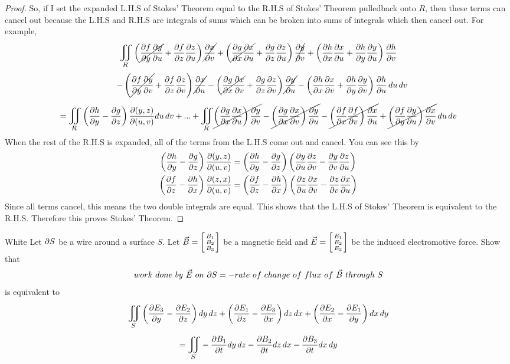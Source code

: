 \documentclass[titlepage]{article}
\begin{document}
\begin{proof}
So, if I set the expanded L.H.S of Stokes' Theorem equal to the R.H.S of Stokes' Theorem pulledback onto $R$, then these terms can cancel out because the L.H.S and R.H.S are integrals of sums which can be broken into sums of integrals which then cancel out. For example,
$$\bigiint{R}{}\left(\cancel{\frac{\p f}{\p y} \frac{\p y}{\p u}} + \frac{\p f}{\p z} \frac{\p z}{\p u}\right)\cancel{\frac{\p x}{\p v}} +  \left(\cancel{\frac{\p g}{\p x} \frac{\p x}{\p u}} + \frac{\p g}{\p z} \frac{\p z}{\p u}\right)\cancel{\frac{\p y}{\p v}}  +  \left(\frac{\p h}{\p x} \frac{\p x}{\p u} + \frac{\p h}{\p y} \frac{\p y}{\p u}\right)\frac{\p h}{\p v}$$ 
$$\quad\hspace{-.15em}-\left(\cancel{\frac{\partial f}{\partial y} \frac{\partial y}{\partial v}} + \frac{\partial f}{\partial z} \frac{\partial z}{\partial v}\right)\cancel{\frac{\partial x}{\partial u}} -  \left(\cancel{\frac{\partial g}{\partial x} \frac{\partial x}{\partial v}} + \frac{\partial g}{\partial z} \frac{\partial z}{\partial v}\right)\cancel{\frac{\partial y}{\partial u}}  -  \left(\frac{\partial h}{\partial x} \frac{\partial x}{\partial v} + \frac{\partial h}{\partial y} \frac{\partial y}{\partial v}\right)\frac{\partial h}{\partial u} \,du\,dv$$ 
$$=\bigiint{R}{} \left( \frac{\p h}{\p y} - \frac{\p g}{\p z} \right)\frac{\p(y,z)}{\p(u,v)}du\,dv + ... +  \bigiint{R}{} \cancel{\left(\frac{\p g}{\p x} \frac{\p x}{\p u}\right) \frac{\p y}{\p v}} -  \cancel{\left(\frac{\p g}{\p x} \frac{\p x}{\p v}\right) \frac{\p y}{\p u}} -  \cancel{\left(\frac{\p f}{\p x} \frac{\p f}{\p v}\right)\frac{\p x}{\p u}} + \cancel{\left( \frac{\p f}{\p y}  \frac{\p y}{\p u}\right)\frac{\p x}{\p v}}\,du\,dv$$
When the rest of the R.H.S is expanded, all of the terms from the L.H.S come out and cancel. You can see this by
\begin{align*}
 \left( \frac{\partial h}{\partial y} - \frac{\partial g}{\partial z} \right)\frac{\partial(y,z)}{\partial(u,v)} &=  \left( \frac{\partial h}{\partial y} - \frac{\partial g}{\partial z} \right) \left(\frac{\partial y}{\partial u}\frac{\partial z}{\partial v} - \frac{\partial y}{\partial v}\frac{\partial z}{\partial u} \right) \\
  \left( \frac{\partial f}{\partial z} - \frac{\partial h}{\partial x} \right)\frac{\partial(z,x)}{\partial(u,v)} &=  \left( \frac{\partial f}{\partial z} - \frac{\partial h}{\partial x} \right) \left( \frac{\partial z}{\partial u} \frac{\partial x}{\partial v} - \frac{\partial z}{\partial v} \frac{\partial x}{\partial u}\right)
\end{align*}
 Since all terms cancel, this means the two double integrals are equal. This shows that the L.H.S of Stokes' Theorem is equivalent to the R.H.S. Therefore this proves Stokes' Theorem.
\end{proof}
\begin{cproblem}{2}{White}
Let $\partial S$ be a wire around a surface $S$. Let $\vec{B} = \left[\begin{smallmatrix}B_1 \\ B_2 \\ B_3\end{smallmatrix}\right]$ be a magnetic field and $\vec{E}=\left[\begin{smallmatrix}E_1 \\ E_2 \\ E_3\end{smallmatrix}\right]$ be the induced electromotive force. Show that 
$$ work \ done \ by \ \vec{E} \ on \ \p S = - rate \ of \ change \ of \ flux \ of \ \vec{B} \ through \ S$$
is equivalent to
$$\bigiint{S}{} \left(\frac{\p E_3}{\p y} - \frac{\p E_2}{\p z}\right)dy\,dz + \left(\frac{\p E_1}{\p z} - \frac{\p E_3}{\p x}\right)dz\,dx + \left(\frac{\p E_2}{\p x}-\frac{\p E_1}{\p y}\right)dx\,dy $$ $$= \bigiint{S}{} -\frac{\p B_1}{\p t} dy\,dz -\frac{\p B_2}{\p t} dz\,dx  -\frac{\p B_3}{\p t} dx\,dy$$
\end{cproblem}
\end{document}
